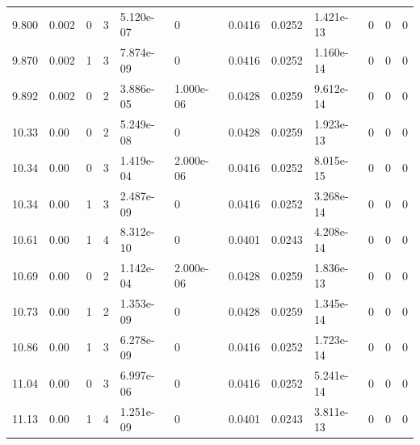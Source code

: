 \documentclass[preview]{standalone}
\begin{document}
{{{\begin{tabular}{L{1.2cm}C{1.2cm} C{0.3cm}C{0.5cm} C{1.4cm}C{1.4cm} C{1.4cm}C{1.4cm} C{1.6cm}C{1.6cm} C{1.6cm}C{1.6cm}}
  9.800  &  0.002  & 0     &  3 &  5.120e-07  & 0  &  0.0416&   0.0252& 1.421e-13 & 0   &  0 & 0  \\ 
  9.870  &  0.002  & 1     &  3 &  7.874e-09  & 0  &  0.0416&   0.0252& 1.160e-14 & 0   &  0 & 0  \\ 
  9.892  &  0.002  & 0     &  2 &  3.886e-05  & 1.000e-06  &  0.0428&   0.0259& 9.612e-14 & 0   &  0 & 0  \\ 
  10.33  &  0.00  & 0     &  2 &  5.249e-08  & 0  &  0.0428&   0.0259& 1.923e-13 & 0   &  0 & 0  \\ 
  10.34  &  0.00  & 0     &  3 &  1.419e-04  & 2.000e-06  &  0.0416&   0.0252& 8.015e-15 & 0   &  0 & 0  \\ 
  10.34  &  0.00  & 1     &  3 &  2.487e-09  & 0  &  0.0416&   0.0252& 3.268e-14 & 0   &  0 & 0  \\ 
  10.61  &  0.00  & 1     &  4 &  8.312e-10  & 0  &  0.0401&   0.0243& 4.208e-14 & 0   &  0 & 0  \\ 
  10.69  &  0.00  & 0     &  2 &  1.142e-04  & 2.000e-06  &  0.0428&   0.0259& 1.836e-13 & 0   &  0 & 0  \\ 
  10.73  &  0.00  & 1     &  2 &  1.353e-09  & 0  &  0.0428&   0.0259& 1.345e-14 & 0   &  0 & 0  \\ 
  10.86  &  0.00  & 1     &  3 &  6.278e-09  & 0  &  0.0416&   0.0252& 1.723e-14 & 0   &  0 & 0  \\ 
  11.04  &  0.00  & 0     &  3 &  6.997e-06  & 0  &  0.0416&   0.0252& 5.241e-14 & 0   &  0 & 0  \\ 
  11.13  &  0.00  & 1     &  4 &  1.251e-09  & 0  &  0.0401&   0.0243& 3.811e-13 & 0   &  0 & 0  \\ 
\hline 
\end{tabular} 

}}}
\end{document}
